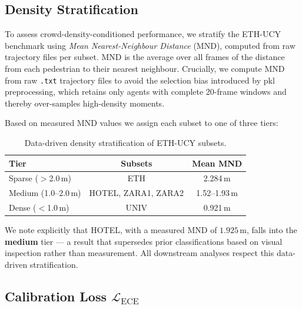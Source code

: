 \documentclass{article}
\begin{document}
\subsection{Density Stratification}
\label{sec:method:density}

To assess crowd-density-conditioned performance, we stratify the ETH-UCY
benchmark using \emph{Mean Nearest-Neighbour Distance} (MND), computed from raw
trajectory files per subset. MND is the average over all frames of the distance
from each pedestrian to their nearest neighbour. Crucially, we compute MND from
raw \texttt{.txt} trajectory files to avoid the selection bias introduced by
pkl preprocessing, which retains only agents with complete 20-frame windows and
thereby over-samples high-density moments.

Based on measured MND values we assign each subset to one of three tiers:

\begin{table}[h]
\centering
\small
\caption{Data-driven density stratification of ETH-UCY subsets.}
\label{tab:density}
\begin{tabular}{l c c}
\toprule
Tier & Subsets & Mean MND \\
\midrule
Sparse (\(>\)2.0\,m) & ETH & 2.284\,m \\
Medium (1.0--2.0\,m) & HOTEL, ZARA1, ZARA2 & 1.52--1.93\,m \\
Dense (\(<\)1.0\,m) & UNIV & 0.921\,m \\
\bottomrule
\end{tabular}
\end{table}

We note explicitly that HOTEL, with a measured MND of \(1.925\,\text{m}\),
falls into the \textbf{medium} tier --- a result that supersedes prior
classifications based on visual inspection rather than measurement. All
downstream analyses respect this data-driven stratification.

\subsection{Calibration Loss \(\mathcal{L}_{\text{ECE}}\)}
\label{sec:method:ece}
\end{document}
